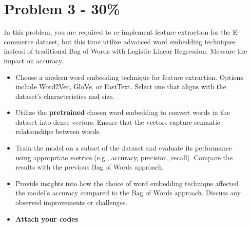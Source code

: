 \documentclass{article}
\begin{document}
\section*{Problem 3 - 30\%}
In this problem, you are required to re-implement feature extraction for the E-commerce dataset, but this time utilize advanced word embedding techniques instead of traditional Bag of Words with Logistic Linear Regression. Measure the impact on accuracy.
\begin{itemize}
    \item Choose a modern word embedding technique for feature extraction. Options include Word2Vec, GloVe, or FastText. Select one that aligns with the dataset's characteristics and size.
    \item Utilize the \textbf{pretrained} chosen word embedding to convert words in the dataset into dense vectors. Ensure that the vectors capture semantic relationships between words.
    \item Train the model on a subset of the dataset and evaluate its performance using appropriate metrics (e.g., accuracy, precision, recall). Compare the results with the previous Bag of Words approach.
    \item Provide insights into how the choice of word embedding technique affected the model's accuracy compared to the Bag of Words approach. Discuss any observed improvements or challenges.
    \item \textbf{Attach your codes}
\end{itemize}
\end{document}
